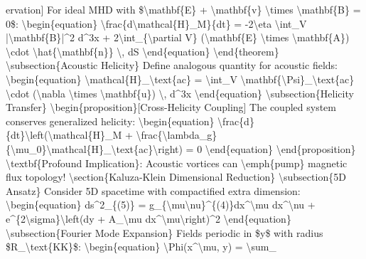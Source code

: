 ervation] For ideal MHD with \$\textbackslash{}mathbf\{E\} + \textbackslash{}mathbf\{v\} \textbackslash{}times \textbackslash{}mathbf\{B\} = 0\$: \textbackslash{}begin\{equation\} \textbackslash{}frac\{d\textbackslash{}mathcal\{H\}\_M\}\{dt\} = -2\textbackslash{}eta \textbackslash{}int\_V |\textbackslash{}mathbf\{B\}|\textasciicircum{}2 d\textasciicircum{}3x + 2\textbackslash{}int\_\{\textbackslash{}partial V\} (\textbackslash{}mathbf\{E\} \textbackslash{}times \textbackslash{}mathbf\{A\}) \textbackslash{}cdot \textbackslash{}hat\{\textbackslash{}mathbf\{n\}\} \textbackslash{}, dS \textbackslash{}end\{equation\} \textbackslash{}end\{theorem\} \textbackslash{}subsection\{Acoustic Helicity\} Define analogous quantity for acoustic fields: \textbackslash{}begin\{equation\} \textbackslash{}mathcal\{H\}\_\textbackslash{}text\{ac\} = \textbackslash{}int\_V \textbackslash{}mathbf\{\textbackslash{}Psi\}\_\textbackslash{}text\{ac\} \textbackslash{}cdot (\textbackslash{}nabla \textbackslash{}times \textbackslash{}mathbf\{u\}) \textbackslash{}, d\textasciicircum{}3x \textbackslash{}end\{equation\} \textbackslash{}subsection\{Helicity Transfer\} \textbackslash{}begin\{proposition\}[Cross-Helicity Coupling] The coupled system conserves generalized helicity: \textbackslash{}begin\{equation\} \textbackslash{}frac\{d\}\{dt\}\textbackslash{}left(\textbackslash{}mathcal\{H\}\_M + \textbackslash{}frac\{\textbackslash{}lambda\_g\}\{\textbackslash{}mu\_0\}\textbackslash{}mathcal\{H\}\_\textbackslash{}text\{ac\}\textbackslash{}right) = 0 \textbackslash{}end\{equation\} \textbackslash{}end\{proposition\} \textbackslash{}textbf\{Profound Implication\}: Acoustic vortices can \textbackslash{}emph\{pump\} magnetic flux topology! \textbackslash{}section\{Kaluza-Klein Dimensional Reduction\} \textbackslash{}subsection\{5D Ansatz\} Consider 5D spacetime with compactified extra dimension: \textbackslash{}begin\{equation\} ds\textasciicircum{}2\_\{(5)\} = g\_\{\textbackslash{}mu\textbackslash{}nu\}\textasciicircum{}\{(4)\}dx\textasciicircum{}\textbackslash{}mu dx\textasciicircum{}\textbackslash{}nu + e\textasciicircum{}\{2\textbackslash{}sigma\}\textbackslash{}left(dy + A\_\textbackslash{}mu dx\textasciicircum{}\textbackslash{}mu\textbackslash{}right)\textasciicircum{}2 \textbackslash{}end\{equation\} \textbackslash{}subsection\{Fourier Mode Expansion\} Fields periodic in \$y\$ with radius \$R\_\textbackslash{}text\{KK\}\$: \textbackslash{}begin\{equation\} \textbackslash{}Phi(x\textasciicircum{}\textbackslash{}mu, y) = \textbackslash{}sum\_

